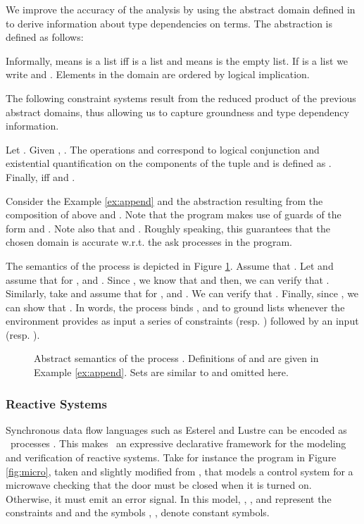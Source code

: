 \documentclass{tlp}
\begin{document}
We  improve the accuracy of the analysis by using the abstract domain defined in \cite{CodishD94} to derive information about type dependencies on terms. The abstraction is defined as follows:

Informally,  means  is a list iff  is a list and    means  is the empty list. If  is a list we write  and . Elements in the domain are ordered by logical implication. 


The following constraint systems result from the reduced product  \cite{CC92} of the previous abstract domains, thus allowing us to capture groundness and type dependency information. 

\begin{definition} \label{def:gt-domain}
Let 
. 
Given , . 
The operations  and   
correspond to logical conjunction and existential quantification on the components of the tuple and    is defined as . 
Finally,  
iff 
 and .
\end{definition}

Consider the Example \ref{ex:append} and the 
abstraction  resulting from the composition of    above and . Note that the program  makes use of guards of the form  and . Note also that     and  . Roughly speaking, this guarantees that the chosen domain is accurate w.r.t. the ask processes in the program.   

The semantics of the process  is depicted in Figure \ref{fig:sem:append}. Assume that . Let
  and assume that for  ,   and . Since , we know that  and then, we can verify that . Similarly, take  and assume that for  ,   and . We can verify that 
 . Finally, since , we can show that .  In words, the process  binds ,  and  to  ground lists whenever the environment provides as input a series of constraints  (resp. ) followed by an input  (resp.  ). 
 
 \begin{figure}
\resizebox{.8\textwidth}{!}{
}
\caption{Abstract semantics of the process . Definitions of  and   are given in Example \ref{ex:append}. Sets 
are similar to  and omitted here. 
\label{fig:sem:append}
}
\end{figure}

\subsubsection{Reactive Systems} 
Synchronous data flow languages   \cite{BeGo92} such as Esterel and  Lustre  can be encoded as \tccp\ processes \cite{tcc-lics94,Tini99}. This  makes \tccp\ an expressive declarative framework for the modeling and verification of reactive systems. 
Take for instance the program in Figure \ref{fig:micro},
taken and slightly modified from \cite{FalaschiV06}, 
 that models a control system for a microwave checking  that the door must
be closed when it is turned on. Otherwise, it must emit an error signal. In this model, , ,  and  represent the constraints  and  and the symbols , ,  denote constant symbols. 
\end{document}
